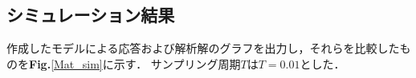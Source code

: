 \documentclass[a4paper,12pt]{jarticle}
\begin{document}
\subsection{シミュレーション結果}
作成したモデルによる応答および解析解のグラフを出力し，それらを比較したものを{\bf Fig.}\ref{Mat_sim}に示す．
サンプリング周期$ T $は$ T = 0.01 $とした．
\begin{figure}[tb]
 \centering
 \hspace{1.0cm}

\end{figure}
\end{document}
